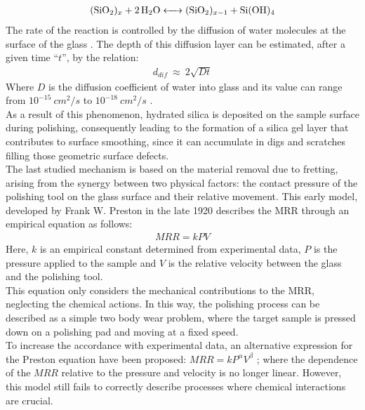 \begin{align}
\ce{(SiO2)_x + 2H2O <-> (SiO2)_{x-1} + Si(OH)4} \label{eq:hydrolytic_scission}
\end{align}
The rate of the reaction is controlled by the diffusion of water molecules at the surface of the glass \cite{cookChemicalProcessesGlass1990}. The depth of this diffusion layer can be estimated, after a given time “$t$”, by the relation: 
\begin{align}
    d_{dif}\ \approx\ 2\sqrt{Dt} \label{eq:diff_length}
\end{align}
Where $D$ is the diffusion coefficient of water into glass and its value can range from $10^{-15} \:cm^2/s$ to $10^{-18}\: cm^2/s$ \cite{nogamiEffectStressWater1984,lanfordDiffusionWaterSiO21985}.
\\
As a result of this phenomenon, hydrated silica is deposited on the sample surface during polishing, consequently leading to the formation of a silica gel layer \cite{ilerChemistrySilicaSolubility1979} that contributes to surface smoothing, since it can accumulate in digs and scratches filling those geometric surface defects. 
\\
The last studied mechanism is based on the material removal due to fretting, arising from the synergy between two physical factors: the contact pressure of the polishing tool on the glass surface and their relative movement. This early model, developed by Frank W. Preston in the late 1920 \cite{prestonTheoryDesignPlate1927} describes the MRR through an empirical equation as follows:
\begin{align}
    MRR=kPV \label{eq:material_removal}
\end{align}
Here, $k$ is an empirical constant determined from experimental data, $P$ is the pressure applied to the sample and $V$ is the relative velocity between the glass and the polishing tool.
\\
This equation only considers the mechanical contributions to the MRR, neglecting the chemical actions. In this way, the polishing process can be described as a simple two body wear problem, where the target sample is pressed down on a polishing pad and moving at a fixed speed.
\\
To increase the accordance with experimental data, an alternative expression for the Preston equation have been proposed: $MRR=kP^\alpha V^\beta$ \cite{zhaoChemicalMechanicalPolishing2013}; where the dependence of the $MRR$ relative to the pressure and velocity is no longer linear. However, this model still fails to correctly describe processes where chemical interactions are crucial.

